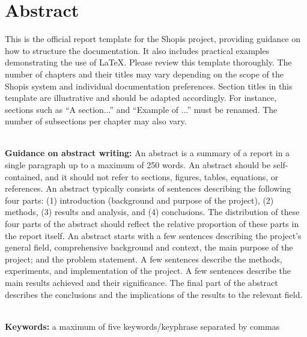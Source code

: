 \chapter*{\center \Large  Abstract}

This is the official report template for the Shopis project, providing guidance on how to structure the documentation. It also includes practical examples demonstrating the use of \LaTeX. Please review this template thoroughly. The number of chapters and their titles may vary depending on the scope of the Shopis system and individual documentation preferences. Section titles in this template are illustrative and should be adapted accordingly. For instance, sections such as “A section...” and “Example of ...” must be renamed. The number of subsections per chapter may also vary.

~\\[1cm]%
\noindent\textbf{Guidance on abstract writing:} An abstract is a summary of a report in a single paragraph up to a maximum of 250 words. An abstract should be self-contained, and it should not refer to sections, figures, tables, equations, or references. An abstract typically consists of sentences describing the following four parts: (1) introduction (background and purpose of the project), (2) methods, (3) results and analysis, and (4) conclusions. The distribution of these four parts of the abstract should reflect the relative proportion of these parts in the report itself. An abstract starts with a few sentences describing the project's general field, comprehensive background and context, the main purpose of the project; and the problem statement. A few sentences describe the methods, experiments, and implementation of the project. A few sentences describe the main results achieved and their significance. The final part of the abstract describes the conclusions and the implications of the results to the relevant field.


~\\[1cm]
\noindent %
\textbf{Keywords:} a maximum of five keywords/keyphrase separated by commas

